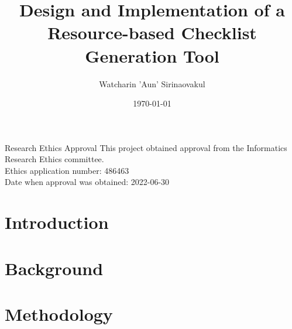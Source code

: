 \documentclass[logo,msc]{infthesis}           %
\begin{document}
\begin{preliminary}

\title{Design and Implementation of a Resource-based Checklist Generation Tool}

\author{Watcharin 'Aun' Sirinaovakul}

\date{\today}

\abstract{

}

\maketitle

\newenvironment{ethics}
   {\begin{frontenv}{Research Ethics Approval}{\LARGE}}
   {\end{frontenv}\newpage}

\begin{ethics}
This project obtained approval from the Informatics Research Ethics committee.\\
Ethics application number: 486463\\
Date when approval was obtained: 2022-06-30

\standarddeclaration
\end{ethics}


\begin{acknowledgements}

\end{acknowledgements}


\tableofcontents
\end{preliminary}


\chapter{Introduction}



\chapter{Background}



\chapter{Methodology}

\end{document}
